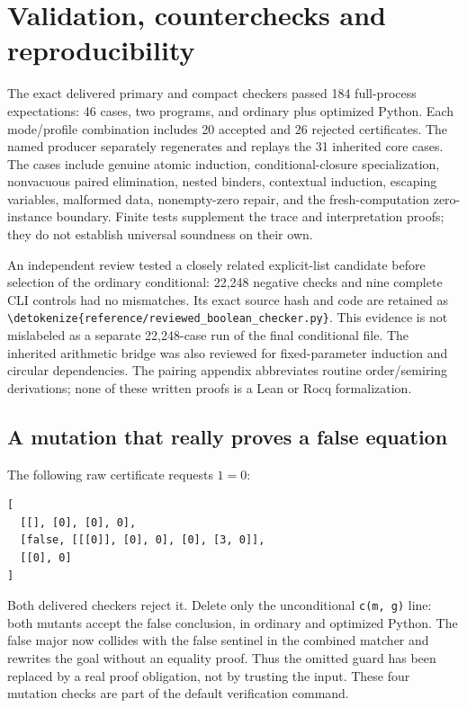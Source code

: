 \documentclass[11pt,letterpaper]{article}
\theoremstyle{definition}\newtheorem{definition}[theorem]{Definition}
\theoremstyle{remark}\newtheorem{remark}[theorem]{Remark}
\newcommand{\file}[1]{\expandafter\nolinkurl\expandafter{\detokenize{#1}}}
\begin{document}


\section{Validation, counterchecks and reproducibility}
\label{sec:validation}

The exact delivered primary and compact checkers passed 184 full-process
expectations: 46 cases, two programs, and ordinary plus optimized Python.
Each mode/profile combination includes 20 accepted and 26 rejected
certificates. The named producer separately regenerates and replays the
31 inherited core cases. The cases include genuine atomic induction,
conditional-closure specialization, nonvacuous paired elimination,
nested binders, contextual induction, escaping variables, malformed
data, nonempty-zero repair, and the fresh-computation zero-instance
boundary. Finite tests supplement the trace and interpretation proofs;
they do not establish universal soundness on their own.

An independent review tested a closely related explicit-list candidate
before selection of the ordinary conditional: 22,248 negative checks
and nine complete CLI controls had no mismatches. Its exact source hash
and code are retained as \file{reference/reviewed_boolean_checker.py}.
This evidence is not mislabeled as a separate 22,248-case run of the
final conditional file. The inherited arithmetic bridge was also
reviewed for fixed-parameter induction and circular dependencies.
The pairing appendix abbreviates routine order/semiring derivations;
none of these written proofs is a Lean or Rocq formalization.

\subsection{A mutation that really proves a false equation}

The following raw certificate requests \(1=0\):
\begin{lstlisting}
[
  [[], [0], [0], 0],
  [false, [[[0]], [0], 0], [0], [3, 0]],
  [[0], 0]
]
\end{lstlisting}
Both delivered checkers reject it. Delete only the unconditional
\texttt{c(m, g)} line: both mutants accept the false conclusion, in
ordinary and optimized Python. The false major now collides with the
false sentinel in the combined matcher and rewrites the goal without
an equality proof. Thus the omitted guard has been replaced by a real
proof obligation, not by trusting the input. These four mutation checks
are part of the default verification command.
\end{document}
